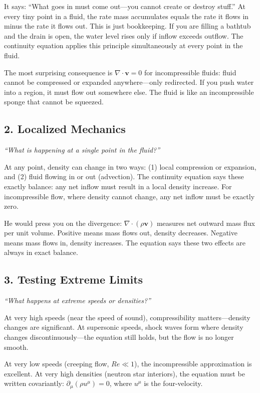 \documentclass[11pt,openright]{book}
\begin{document}
It says: ``What goes in must come out---you cannot create or destroy stuff.'' At every tiny point in a fluid, the rate mass accumulates equals the rate it flows in minus the rate it flows out. This is just bookkeeping. If you are filling a bathtub and the drain is open, the water level rises only if inflow exceeds outflow. The continuity equation applies this principle simultaneously at every point in the fluid.

The most surprising consequence is $\nabla \cdot \mathbf{v} = 0$ for incompressible fluids: fluid cannot be compressed or expanded anywhere---only redirected. If you push water into a region, it must flow out somewhere else. The fluid is like an incompressible sponge that cannot be squeezed.

\subsection*{2. Localized Mechanics}
\textit{``What is happening at a single point in the fluid?''}

At any point, density can change in two ways: (1) local compression or expansion, and (2) fluid flowing in or out (advection). The continuity equation says these exactly balance: any net inflow must result in a local density increase. For incompressible flow, where density cannot change, any net inflow must be exactly zero.

He would press you on the divergence: $\nabla \cdot (\rho \mathbf{v})$ measures net outward mass flux per unit volume. Positive means mass flows out, density decreases. Negative means mass flows in, density increases. The equation says these two effects are always in exact balance.

\subsection*{3. Testing Extreme Limits}
\textit{``What happens at extreme speeds or densities?''}

At very high speeds (near the speed of sound), compressibility matters---density changes are significant. At supersonic speeds, shock waves form where density changes discontinuously---the equation still holds, but the flow is no longer smooth.

At very low speeds (creeping flow, $Re \ll 1$), the incompressible approximation is excellent. At very high densities (neutron star interiors), the equation must be written covariantly: $\partial_\mu (\rho u^\mu) = 0$, where $u^\mu$ is the four-velocity.
\end{document}
